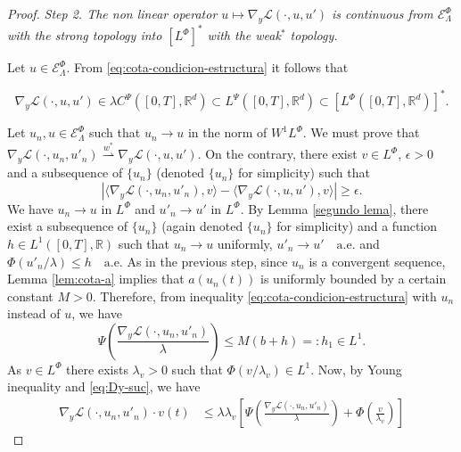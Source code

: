 \documentclass[twoside]{article}
\theoremstyle{remark}
\newcommand{\lphi}{L^{\Phi}}
\newcommand{\lpsi}{L^{\Psi}}
\newcommand{\wphi}{W^{1}\lphi}
\newcommand{\domi}{\mathcal{E}^{\Phi}}
\newcommand{\rr}{\mathbb{R}}
\renewcommand{\leq}{\leqslant}
\renewcommand{\geq}{\geqslant}
\begin{document}
\begin{proof}
\noindent\emph{Step 2. The non linear operator   $u
 \mapsto  \nabla_y\mathcal{L}(\cdot,u,u')$ is continuous from $\domi_{\Lambda}$ with the strong topology  
into $\left[\lphi\right]^*$  with the weak$^*$ topology.}

 Let $u\in \domi_{\Lambda}$.  From  \eqref{eq:cota-condicion-estructura} it follows that 

\begin{equation}\label{eq:DyLpsi-clase}
\nabla_y\mathcal{L}(\cdot,u,u')\in \lambda C^{\Psi}\left([0,T],\rr^d\right)\subset\lpsi\left([0,T],\rr^d\right)\subset\left[\lphi\left([0,T],\rr^d\right)\right]^*.
\end{equation}






Let $u_n,u\in \domi_{\Lambda}$ such that $u_n\to u$ in the norm of $\wphi$. 
We must prove that  $\nabla_y\mathcal{L}(\cdot,u_n,u'_n)\overset{w^*}{\rightharpoonup} 
\nabla_y\mathcal{L}(\cdot,u,u')$. 
On the contrary, there exist $v\in\lphi$, $\epsilon>0$ and a subsequence of $\{u_n\}$ (denoted  $\{u_n\}$ for simplicity)  such that
\begin{equation}\label{cota_eps}
 \left| \langle \nabla_y\mathcal{L}(\cdot,u_n,u'_n),v \rangle - 
\langle  \nabla_y\mathcal{L}(\cdot,u,u'),v \rangle\right|\geq \epsilon.
\end{equation}
We have $u_n\rightarrow u$ in $\lphi$ and
$u'_n\rightarrow u'$ in $\lphi$.
 By Lemma \ref{segundo lema}, there exist a subsequence of $\{u_n\}$ (again denoted  $\{u_n\}$ for simplicity) 
and a function $h\in L^1([0,T],\rr)$ such that 
$u_n\rightarrow u$ uniformly, $u'_n\rightarrow u' \quad\text{a.e.}$ and $\Phi(u'_n/\lambda)\leq h\quad\text{a.e.}$ 
As in the previous step, since $u_n$ is a convergent sequence, 
Lemma \ref{lem:cota-a} implies that $a(u_n(t))$ is uniformly bounded by a certain constant $M>0$. 
Therefore,   from inequality  \eqref{eq:cota-condicion-estructura} with $u_n$ instead of $u$, we have 
\begin{equation}\label{eq:Dy-suc}
  \Psi\left(\frac{\nabla_y\mathcal{L}(\cdot,u_n,u'_n)}{\lambda}\right)   
	\leq M (b+h)=:h_1\in L^1.
\end{equation}
As $v \in \lphi$ there exists $\lambda_v>0$ such that $\Phi(v/\lambda_v)\in L^1$. 
Now, by Young inequality and \eqref{eq:Dy-suc}, we have
\begin{equation}\label{eq:Dy_lambda-Psi}
\begin{split}
\nabla_y\mathcal{L}(\cdot,u_{n},u'_{n})\cdot v(t)
&\leq 
\lambda\lambda_v\left[\Psi\left(\frac{\nabla_y\mathcal{L}(\cdot,u_{n},u'_{n})}{\lambda}\right)+\Phi\left(\frac{v}{\lambda_v}\right)\right]

\end{split}
\end{equation}
\end{proof}
\end{document}
